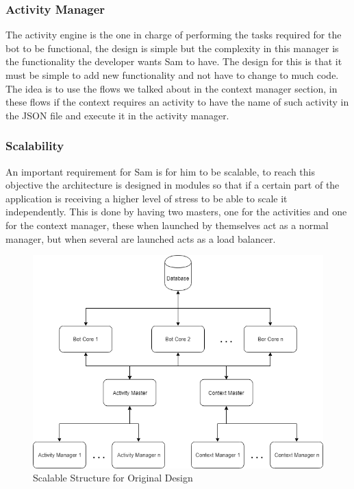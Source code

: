 \clearpage
\subsubsection{Activity Manager}\label{sec:chap4_ori_act_man}
The activity engine is the one in charge of performing the tasks required for the bot to be functional, the design is simple but the complexity in this manager is the functionality the developer wants Sam to have. The design for this is that it must be simple to add new functionality and not have to change to much code. The idea is to use the flows we talked about in the context manager section, in these flows if the context requires an activity to have the name of such activity in the JSON file and execute it in the activity manager.

\subsubsection{Scalability}\label{sec:chap4_ori_scale}
An important requirement for Sam is for him to be scalable, to reach this objective the architecture is designed in modules so that if a certain part of the application is receiving a higher level of stress to be able to scale it independently. This is done by having two masters, one for the activities and one for the context manager, these when launched by themselves act as a normal manager, but when several are launched acts as a load balancer.

\begin{center}
	\begin{figure}[h!]
		\centering
		\includegraphics[scale=0.65]{./images/4-des-scal}
		\caption{Scalable Structure for Original Design}
		\label{4_des_scal}
	\end{figure}
\end{center}

